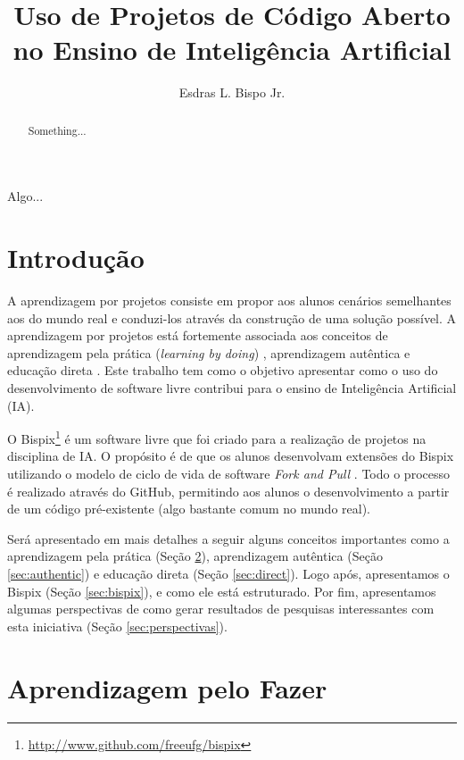 \documentclass[12pt]{article}
\title{Uso de Projetos de Código Aberto 
	\\no Ensino de Inteligência Artificial}
\author{Esdras L. Bispo Jr.\inst{1} }
\begin{document}
 

\maketitle

\begin{abstract}
  Something...
\end{abstract}
     
\begin{resumo} 
  Algo...
\end{resumo}


\section{Introdução}

A aprendizagem por projetos consiste em propor aos alunos cenários semelhantes aos do mundo real e conduzi-los através da construção de uma solução possível. A aprendizagem por projetos está fortemente associada aos conceitos de aprendizagem pela prática ({\it learning by doing}) \cite{anzai:1979, schank:1999, benssen:2015}, aprendizagem autêntica \cite{herrington:2000, herrington:2006, lombardi:2007} e educação direta \cite{lakey:2010}. Este trabalho tem como o objetivo apresentar como o uso do desenvolvimento de software livre contribui para o ensino de Inteligência Artificial (IA).

O Bispix\footnote{\url{http://www.github.com/freeufg/bispix}} é um software livre que foi criado para a realização de projetos na disciplina de IA. O propósito é de que os alunos desenvolvam extensões do Bispix utilizando o modelo de ciclo de vida de software {\it Fork and Pull} \cite{alasbali:2015, buffardi:2015}. Todo o processo é realizado através do GitHub,  permitindo aos alunos o desenvolvimento a partir de um código pré-existente (algo bastante comum no mundo real).

Será apresentado em mais detalhes a seguir alguns conceitos importantes como a aprendizagem pela prática (Seção \ref{sec:doing}), aprendizagem autêntica (Seção \ref{sec:authentic}) e educação direta (Seção \ref{sec:direct}). Logo após, apresentamos o Bispix (Seção \ref{sec:bispix}), e como ele está estruturado. Por fim, apresentamos algumas perspectivas de como gerar resultados de pesquisas interessantes com esta iniciativa (Seção \ref{sec:perspectivas}).

\section{Aprendizagem pelo Fazer} \label{sec:doing}
\end{document}
